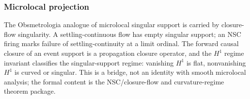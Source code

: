 \subsubsection{Microlocal projection}

\begin{theorem}\label{thm:microlocal-support}\leanok{}
The Obsmetrologia analogue of microlocal singular support is carried by closure-flow
singularity. A settling-continuous flow has empty singular support; an NSC
firing marks failure of settling-continuity at a limit ordinal. The forward
causal closure of an event support is a propagation closure operator, and the
$H^1$ regime invariant classifies the singular-support regime: vanishing
$H^1$ is flat, nonvanishing $H^1$ is curved or singular. This is a bridge, not
an identity with smooth microlocal analysis; the formal content is the
NSC/closure-flow and curvature-regime theorem package.
\end{theorem}
